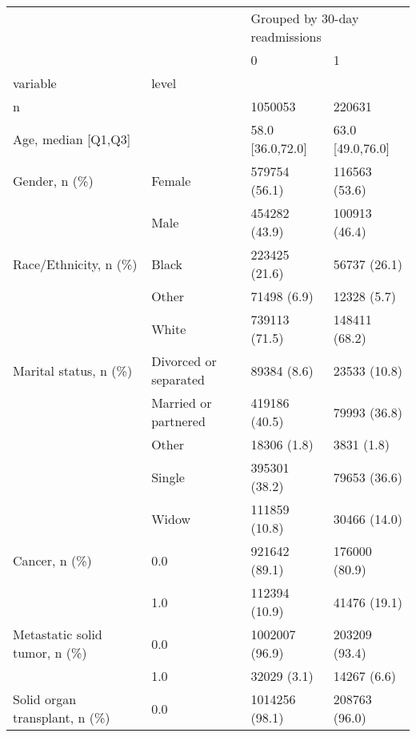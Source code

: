 \begin{tabular}{llll}
\toprule
                           &   & \multicolumn{2}{l}{Grouped by 30-day readmissions} \\
                           &   &                              0 &                  1 \\
variable & level &                                &                    \\
\midrule
n &   &                        1050053 &             220631 \\
Age, median [Q1,Q3] &   &               58.0 [36.0,72.0] &   63.0 [49.0,76.0] \\
Gender, n (\%) & Female &                  579754 (56.1) &      116563 (53.6) \\
                           & Male &                  454282 (43.9) &      100913 (46.4) \\
Race/Ethnicity, n (\%) & Black &                  223425 (21.6) &       56737 (26.1) \\
                           & Other &                    71498 (6.9) &        12328 (5.7) \\
                           & White &                  739113 (71.5) &      148411 (68.2) \\
Marital status, n (\%) & Divorced or separated &                    89384 (8.6) &       23533 (10.8) \\
                           & Married or partnered &                  419186 (40.5) &       79993 (36.8) \\
                           & Other &                    18306 (1.8) &         3831 (1.8) \\
                           & Single &                  395301 (38.2) &       79653 (36.6) \\
                           & Widow &                  111859 (10.8) &       30466 (14.0) \\
Cancer, n (\%) & 0.0 &                  921642 (89.1) &      176000 (80.9) \\
                           & 1.0 &                  112394 (10.9) &       41476 (19.1) \\
Metastatic solid tumor, n (\%) & 0.0 &                 1002007 (96.9) &      203209 (93.4) \\
                           & 1.0 &                    32029 (3.1) &        14267 (6.6) \\
Solid organ transplant, n (\%) & 0.0 &                 1014256 (98.1) &      208763 (96.0) \\

\end{tabular}
